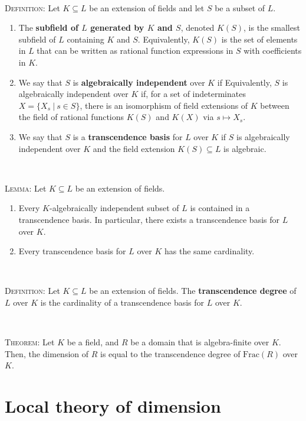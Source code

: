 \documentclass[12pt]{amsart}
\newcommand{\0}{$\phantom{.}$}
\newcommand{\1}{\mathbbm{1}}
\begin{document}
\

	\noindent	\textsc{Definition:} Let $K\subseteq L$ be an extension of fields and let $S$ be a subset of $L$.
	\begin{enumerate}
	\item The \textbf{subfield of $L$ generated by $K$ and $S$}, denoted $K(S)$, is the smallest subfield of $L$ containing $K$ and $S$. Equivalently, $K(S)$ is the set of elements in $L$ that can be written as rational function expressions in $S$ with coefficients in $K$.
	\item We say that $S$ is \textbf{algebraically independent} over $K$ if 
	Equivalently, $S$ is algebraically independent over $K$ if, for a set of indeterminates $X=\{X_s \ | \ s\in S\}$, there is an isomorphism of field extensions of $K$ between the field of rational functions $K(S)$ and $K(X)$ via $s\mapsto X_s$.
	\item We say that $S$ is a \textbf{transcendence basis} for $L$ over $K$ if $S$ is algebraically independent over $K$ and the field extension $K(S) \subseteq L$ is algebraic.
	\end{enumerate}
	
	\
	
	\noindent \textsc{Lemma:} Let $K\subseteq L$ be an extension of fields.
\begin{enumerate}
\item Every $K$-algebraically independent subset of $L$ is contained in a transcendence basis. In particular, there exists a transcendence basis for $L$ over $K$.
\item Every transcendence basis for $L$ over $K$ has the same cardinality.
\end{enumerate}
	
	\
	
\noindent	\textsc{Definition:} Let $K\subseteq L$ be an extension of fields. The \textbf{transcendence degree} of $L$ over $K$ is the cardinality of a transcendence basis for $L$ over $K$.
	

	\
	
\noindent	\textsc{Theorem:} Let $K$ be a field, and $R$ be a domain that is algebra-finite over $K$. Then, the dimension of $R$ is equal to the transcendence degree of $\mathrm{Frac}(R)$ over $K$.


\newpage 

\section{Local theory of dimension}
\end{document}
